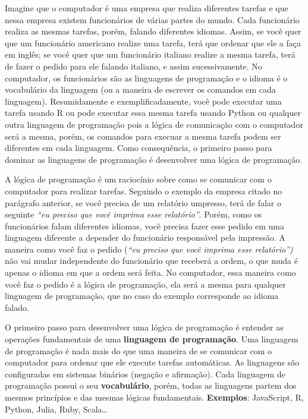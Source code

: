 \documentclass[
  letterpaper,
  DIV=11,
  numbers=noendperiod]{scrreprt}
\begin{document}
Imagine que o computador é uma empresa que realiza diferentes tarefas e
que nessa empresa existem funcionários de várias partes do mundo. Cada
funcionário realiza as mesmas tarefas, porém, falando diferentes
idiomas. Assim, se você quer que um funcionário americano realize uma
tarefa, terá que ordenar que ele a faça em inglês; se você quer que um
funcionário italiano realize a mesma tarefa, terá de fazer o pedido para
ele falando italiano, e assim sucessivamente. No computador, os
funcionários são as linguagens de programação e o idioma é o vocabulário
da linguagem (ou a maneira de escrever os comandos em cada linguagem).
Resumidamente e exemplificadamente, você pode executar uma tarefa usando
R ou pode executar essa mesma tarefa usando Python ou qualquer outra
linguagem de programação pois a lógica de comunicação com o computador
será a mesma, porém, os comandos para execuar a mesma tarefa podem ser
diferentes em cada linguagem. Como consequência, o primeiro passo para
dominar as linguagens de programação é desenvolver uma lógica de
programação.

A lógica de programação é um raciocínio sobre como se comunicar com o
computador para realizar tarefas. Seguindo o exemplo da empresa citado
no parágrafo anterior, se você precisa de um relatório umpresso, terá de
falar o seguinte \emph{``eu preciso que você imprima esse relatório''}.
Porém, como os funcionários falam diferentes idiomas, você precisa fazer
esse pedido em uma linguagem diferente a depender do funcionário
responsável pela impressão. A maneira como você faz o pedido (\emph{``eu
preciso que você imprima esse relatório'')} não vai mudar independente
do funcionário que receberá a ordem, o que muda é apenas o idioma em que
a ordem será feita. No computador, essa maneira como você faz o pedido é
a lógica de programação, ela será a mesma para qualquer linguagem de
programação, que no caso do exemplo corresponde ao idioma falado.

O primeiro passo para desenvolver uma lógica de programação é entender
as operações fundamentais de uma \textbf{linguagem de programação}. Uma
linguagem de programação é nada mais do que uma maneira de se comunicar
com o computador para ordenar que ele execute tarefas automáticas. As
linguagens são configuradas em sistemas binários (negação e afirmação).
Cada linguagem de programação possui o seu \textbf{vocabulário}, porém,
todas as linguagens partem dos mesmos princípios e das mesmas lógicas
fundamentais. \textbf{Exemplos}: JavaScript, R, Python, Julia, Ruby,
Scala\ldots{}
\end{document}
